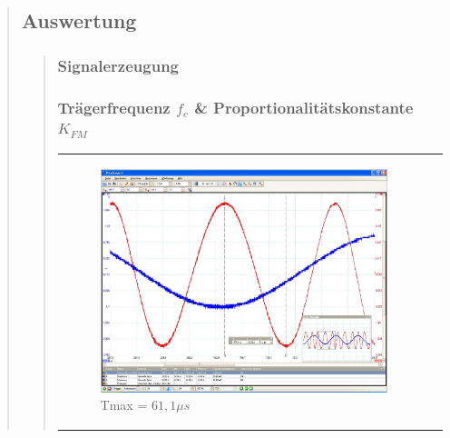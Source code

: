 \begin{quote}
    \subsection{Auswertung}
    \begin{quote}
        
        
        
        \subsubsection{Signalerzeugung}
        \begin{quote}
            
        \end{quote}
        
        
        
        \subsubsection{Trägerfrequenz $f_c$ \& Proportionalitätskonstante $K_{FM}$}
            
            
            
            \begin{center}
            \begin{tabular}{ll}
            
            \hspace{-4cm}
                \begin{minipage}{0.67\textwidth}
                    
                    \begin{figure}[H]
                        \label{fig:Tmax}
                        \includegraphics[scale=0.25, trim = 0mm 0mm 0mm 0mm, clip]{Bilder/Tmax}
                        \caption{Tmax = $61,1 \mu s$}
                    \end{figure}
                    

\end{minipage}
\end{tabular}
\end{center}
\end{quote}
\end{quote}
